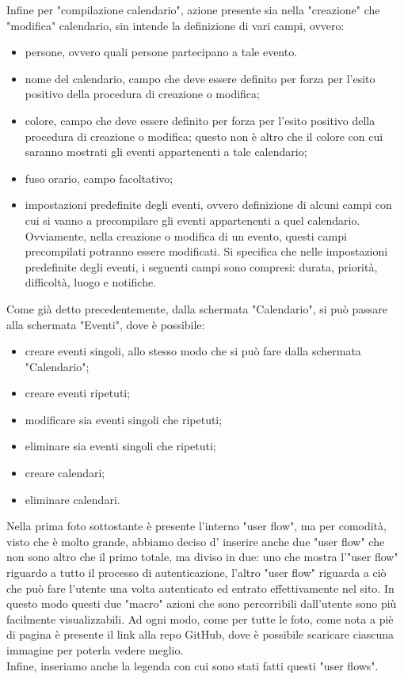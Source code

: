 Infine per "compilazione calendario", azione presente sia nella "creazione" che "modifica" calendario, sin intende la definizione di vari campi, ovvero:
\begin{itemize}
    \item persone, ovvero quali persone partecipano a tale evento.
    \item nome del calendario, campo che deve essere definito per forza per l'esito positivo della procedura di creazione o modifica;
    \item colore, campo che deve essere definito per forza per l'esito positivo della procedura di creazione o modifica; questo non è altro che il colore con cui saranno mostrati gli eventi appartenenti a tale calendario;
    \item fuso orario, campo facoltativo;
    \item impostazioni predefinite degli eventi, ovvero definizione di alcuni campi con cui si vanno a precompilare gli eventi appartenenti a quel calendario. Ovviamente, nella creazione o modifica di un evento, questi campi precompilati potranno essere modificati. Si specifica che nelle impostazioni predefinite degli eventi, i seguenti campi sono compresi: durata, priorità, difficoltà, luogo e notifiche.
\end{itemize}
Come già detto precedentemente, dalla schermata "Calendario", si può passare alla schermata "Eventi", dove è possibile:
\begin{itemize}
    \item creare eventi singoli, allo stesso modo che si può fare dalla schermata "Calendario";
    \item creare eventi ripetuti;
    \item modificare sia eventi singoli che ripetuti;
    \item eliminare sia eventi singoli che ripetuti;
    \item creare calendari;
    \item eliminare calendari.
\end{itemize}
Nella prima foto sottostante è presente l'interno "user flow", ma per comodità, visto che è molto grande, abbiamo deciso d' inserire anche due "user flow" che non sono altro che il primo totale, ma diviso in due: uno che mostra l'"user flow" riguardo a tutto il processo di autenticazione, l'altro "user flow" riguarda a ciò che può fare l'utente una volta autenticato ed entrato effettivamente nel sito. In questo modo questi due "macro" azioni che sono percorribili dall'utente sono più facilmente visualizzabili. Ad ogni modo, come per tutte le foto, come nota a piè di pagina è presente il link alla repo GitHub, dove è possibile scaricare ciascuna immagine per poterla vedere meglio. \\
Infine, inseriamo anche la legenda con cui sono stati fatti questi "user flows".

